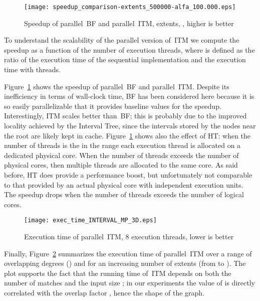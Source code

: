 \documentclass[10pt, conference, compsocconf]{IEEEtran}
\begin{document}
\begin{figure}[t]
\centering \texttt{[image: speedup\_comparison-extents\_500000-alfa\_100.000.eps]}
\caption{Speedup of parallel~\ac{BF} and parallel~\ac{ITM},  extents, , higher is better}\label{fig:parallel_comparison_speedup}
\end{figure}

To understand the scalability of the parallel version of~\ac{ITM} we
compute the speedup  as a function of the number  of execution
threads, where  is defined as the ratio of the execution time of
the sequential implementation and the execution time with  threads.

Figure~\ref{fig:parallel_comparison_speedup} shows the speedup of
parallel~\ac{BF} and parallel~\ac{ITM}. Despite its inefficiency in
terms of wall-clock time, \ac{BF} has been considered here because it
is so easily parallelizable that it provides baseline values for the
speedup. Interestingly, \ac{ITM} scales better than~\ac{BF}; this is
probably due to the improved locality achieved by the Interval Tree,
since the intervals stored by the nodes near the root are likely kept
in cache. Figure~\ref{fig:parallel_comparison_speedup} shows also the
effect of HT: when the number of threads  is the in the range  each execution thread is allocated on a dedicated physical
core. When the number of threads exceeds the number of physical cores,
then multiple threads are allocated to the same core. As said before,
HT does provide a performance boost, but unfortunately not comparable
to that provided by an actual physical core with independent execution
units. The speedup drops when the number of threads exceeds the number
of logical cores.
 
\begin{figure}[t]
\centering\texttt{[image: exec\_time\_INTERVAL\_MP\_3D.eps]}
\caption{Execution time of parallel~\ac{ITM}, 8 execution threads, lower is better}\label{fig:parallel_ITM_scalability_evaluation}
\end{figure}

Finally, Figure~\ref{fig:parallel_ITM_scalability_evaluation}
summarizes the execution time of parallel~\ac{ITM} over a range of
overlapping degrees () and for an increasing
number of extents (from  to ). The
plot supports the fact that the running time of~\ac{ITM} depends on
both the number of matches  and the input size ; in our
experiments the value of  is directly correlated with the overlap
factor , hence the shape of the graph.
 
\end{document}
